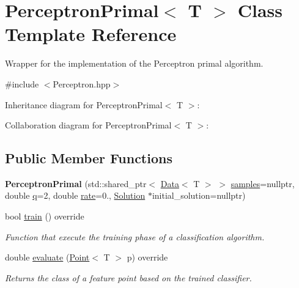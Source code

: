 \hypertarget{class_perceptron_primal}{}\section{Perceptron\+Primal$<$ T $>$ Class Template Reference}
\label{class_perceptron_primal}


Wrapper for the implementation of the Perceptron primal algorithm.  




{\ttfamily \#include $<$Perceptron.\+hpp$>$}



Inheritance diagram for Perceptron\+Primal$<$ T $>$\+:


Collaboration diagram for Perceptron\+Primal$<$ T $>$\+:
\subsection*{Public Member Functions}
\begin{DoxyCompactItemize}
\item 
\mbox{\label{class_perceptron_primal_ae0fac9ce6fde7a106b8194bb08104418}} 
{\bfseries Perceptron\+Primal} (std\+::shared\+\_\+ptr$<$ \mbox{\hyperlink{class_data}{Data}}$<$ T $>$ $>$ \mbox{\hyperlink{class_classifier_a0000b47a2e0784ada4c52d7046c4adb8}{samples}}=nullptr, double \mbox{\hyperlink{class_primal_classifier_ae30c00c25bce4b1623baa54b5e2812b4}{q}}=2, double \mbox{\hyperlink{class_classifier_a7b1c4ef87631bd9e46682e5bc4315111}{rate}}=0., \mbox{\hyperlink{class_solution}{Solution}} $\ast$initial\+\_\+solution=nullptr)
\item 
bool \mbox{\hyperlink{class_perceptron_primal_ac6cafe7a8fabfb607761024ce60a6861}{train}} () override
\begin{DoxyCompactList}\small\item\em Function that execute the training phase of a classification algorithm. \end{DoxyCompactList}\item 
double \mbox{\hyperlink{class_perceptron_primal_a547d98d8d61480d5bc44fe759c3a8e28}{evaluate}} (\mbox{\hyperlink{class_point}{Point}}$<$ T $>$ p) override
\begin{DoxyCompactList}\small\item\em Returns the class of a feature point based on the trained classifier. \end{DoxyCompactList}\end{DoxyCompactItemize}
